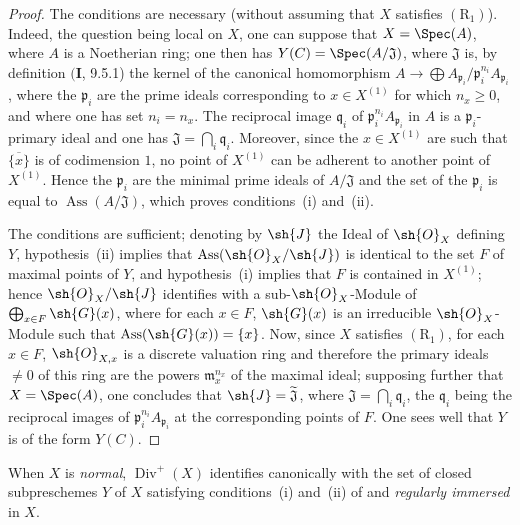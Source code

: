 \begin{proof}
The conditions are necessary (without assuming that $X$ satisfies $(\mathrm{R}_1)$).
Indeed, the question being local on $X$, one can suppose that $X=\Spec(A)$, where $A$ is a Noetherian ring;
one then has $Y(C)=\Spec(A/\mathfrak{J})$, where $\mathfrak{J}$ is, by definition $(\mathbf{I}$, 9.5.1) the kernel of the canonical homomorphism $A\to\bigoplus A_{\mathfrak{p}_i}/\mathfrak{p}_i^{n_i}A_{\mathfrak{p}_i}$, where the $\mathfrak{p}_i$ are the prime ideals corresponding to $x\in X^{(1)}$ for which $n_x\geq 0$, and where one has set $n_i=n_x$.
The reciprocal image $\mathfrak{q}_i$ of $\mathfrak{p}_i^{n_i}A_{\mathfrak{p}_i}$ in $A$ is a $\mathfrak{p}_i$-primary ideal and one has $\mathfrak{J}=\bigcap_i\mathfrak{q}_i$.
Moreover, since the $x\in X^{(1)}$ are such that $\overline{\{x\}}$ is of codimension $1$, no point of $X^{(1)}$ can be adherent to another point of $X^{(1)}$.
Hence the $\mathfrak{p}_i$ are the minimal prime ideals of $A/\mathfrak{J}$ and the set of the $\mathfrak{p}_i$ is equal to $\operatorname{Ass}(A/\mathfrak{J})$, which proves conditions~(i) and~(ii).

The conditions are sufficient;
denoting by $\sh{J}$ the Ideal of $\sh{O}_X$ defining $Y$, hypothesis~(ii) implies that $\operatorname{Ass}(\sh{O}_X/\sh{J})$ is identical to the set $F$ of maximal points of $Y$, and hypothesis~(i) implies that $F$ is contained in $X^{(1)}$;
hence  $\sh{O}_X/\sh{J}$ identifies with a sub-$\sh{O}_X$-Module of $\bigoplus_{x\in F}\sh{G}(x)$, where for each $x\in F$, $\sh{G}(x)$ is an irreducible $\sh{O}_X$-Module such that $\operatorname{Ass}(\sh{G}(x))=\{x\}$.
Now, since $X$ satisfies $(\mathrm{R}_1)$, for each $x\in F$, $\sh{O}_{X,x}$ is a discrete valuation ring and therefore the primary ideals $\neq 0$ of this ring are the powers $\mathfrak{m}_x^{n_x}$ of the maximal ideal;
supposing further that $X=\Spec(A)$, one concludes that $\sh{J}=\widetilde{\mathfrak{J}}$, where $\mathfrak{J}=\bigcap_i\mathfrak{q}_i$, the $\mathfrak{q}_i$ being the reciprocal images of $\mathfrak{p}_i^{n_i}A_{\mathfrak{p}_i}$ at the corresponding points of $F$.
One sees well that $Y$ is of the form $Y(C)$.
\end{proof}


\begin{env}[21.7.3.1]
\label{IV.21.7.3.1}
When $X$ is \emph{normal}, $\operatorname{Div}^+(X)$ identifies canonically with the set of closed subpreschemes $Y$ of $X$ satisfying conditions~(i) and~(ii) of  and \emph{regularly immersed} in $X$.
\end{env}

